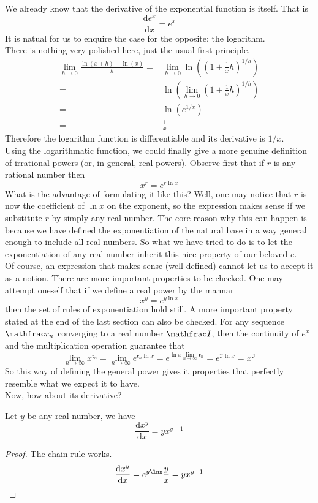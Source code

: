 We already know that the derivative of the exponential function is itself.
That is
$$\frac{\mathrm de^x}{\mathrm dx}=e^x$$
It is natual for us to enquire the case for the opposite: the logarithm.\\
There is nothing very polished here, just the usual first principle.
\begin{align*}
    \lim_{h\to0}\frac{\ln(x+h)-\ln(x)}{h}
    =&\lim_{h\to0}\ln\left(\left(1+\frac{1}{x}h\right)^{1/h}\right)\\
    =&\ln\left(\lim_{h\to0}\left(1+\frac{1}{x}h\right)^{1/h}\right)\\
    =&\ln(e^{1/x})\\
    =&\frac{1}{x}
\end{align*}
Therefore the logarithm function is differentiable and its derivative is $1/x$.\\
Using the logarithmatic function, we could finally give a more genuine definition of irrational powers (or, in general, real powers).
Observe first that if $r$ is any rational number then
$$x^r=e^{r\ln{x}}$$
What is the advantage of formulating it like this?
Well, one may notice that $r$ is now the coefficient of $\ln{x}$ on the exponent, so the expression makes sense if we substitute $r$ by simply any real number.
The core reason why this can happen is because we have defined the exponentiation of the natural base in a way general enough to include all real numbers.
So what we have tried to do is to let the exponentiation of any real number inherit this nice property of our beloved $e$.\\
Of course, an expression that makes sense (well-defined) cannot let us to accept it as a notion.
There are more important properties to be checked.
One may attempt oneself that if we define a real power by the mannar
$$x^y=e^{y\ln{x}}$$
then the set of rules of exponentiation hold still.
A more important property stated at the end of the last section can also be checked.
For any sequence $\mathfrac r_n$ converging to a real number $\mathfrac I$, then the continuity of $e^x$ and the multiplication operation guarantee that
$$\lim_{n\to\infty}x^{\mathfrak r_n}=\lim_{n\to\infty}e^{\mathfrak r_n\ln{x}}=e^{\ln{x}\lim_{n\to\infty}\mathfrak r_n}=e^{\mathfrak I\ln{x}}=x^{\mathfrak I}$$
So this way of defining the general power gives it properties that perfectly resemble what we expect it to have.\\
Now, how about its derivative?
\begin{theorem}
    Let $y$ be any real number, we have
    $$\frac{\mathrm dx^y}{\mathrm dx}=yx^{y-1}$$
\end{theorem}
\begin{proof}
    The chain rule works.
    $$\frac{\mathrm dx^y}{\mathrm dx}=e^{y\lnx}\frac{y}{x}=yx^{y-1}$$
\end{proof}
